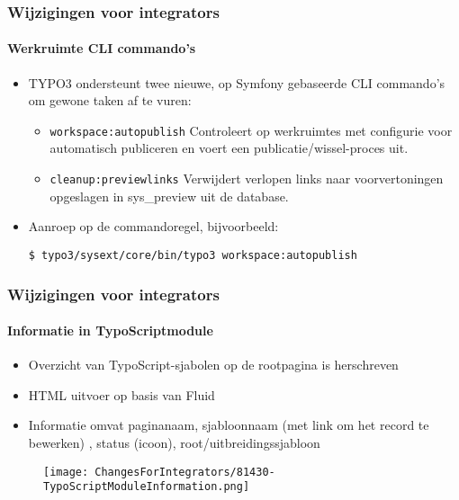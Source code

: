 
\begin{frame}[fragile]
	\frametitle{Wijzigingen voor integrators}
	\framesubtitle{Werkruimte CLI commando's}

	\lstset{basicstyle=\small\ttfamily}

	\begin{itemize}
		\item TYPO3 ondersteunt twee nieuwe, op Symfony gebaseerde CLI commando's
			om gewone taken af te vuren:

			\begin{itemize}

				\item \texttt{workspace:autopublish}\newline
					Controleert op werkruimtes met configurie voor automatisch publiceren
					en voert een publicatie/wissel-proces uit.
					\newline

				\item \texttt{cleanup:previewlinks}\newline
					Verwijdert verlopen links naar voorvertoningen opgeslagen in sys\_preview
					uit de database.

			\end{itemize}

		\item Aanroep op de commandoregel, bijvoorbeeld:

			\begin{lstlisting}
$ typo3/sysext/core/bin/typo3 workspace:autopublish
			\end{lstlisting}

	\end{itemize}

\end{frame}


\begin{frame}[fragile]
	\frametitle{Wijzigingen voor integrators}
	\framesubtitle{Informatie in TypoScriptmodule}

	\begin{itemize}
		\item Overzicht van TypoScript-sjabolen op de rootpagina is herschreven
		\item HTML uitvoer op basis van Fluid
		\item Informatie omvat paginanaam, sjabloonnaam (met link om het record te bewerken)
			, status (icoon), root/uitbreidingssjabloon

	\end{itemize}

	\begin{figure}
		\texttt{[image: ChangesForIntegrators/81430-TypoScriptModuleInformation.png]}
	\end{figure}

\end{frame}

